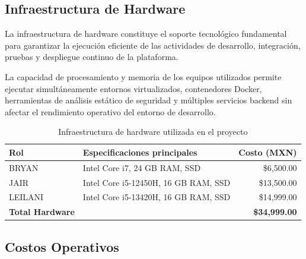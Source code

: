 \documentclass[12pt,oneside,letterpaper]{book}
\begin{document}
\vspace{0.5cm}

\subsection{Infraestructura de Hardware}

La infraestructura de hardware constituye el soporte tecnológico fundamental para garantizar la ejecución eficiente de las actividades de desarrollo, integración, pruebas y despliegue continuo de la plataforma.

La capacidad de procesamiento y memoria de los equipos utilizados permite ejecutar simultáneamente entornos virtualizados, contenedores Docker, herramientas de análisis estático de seguridad y múltiples servicios backend sin afectar el rendimiento operativo del entorno de desarrollo.

\begin{table}[H]
\centering
\caption{Infraestructura de hardware utilizada en el proyecto}

\begin{tabular}{p{3cm} p{8cm} r}
\toprule
\rowcolor{headerblue}
\textbf{Rol} & \textbf{Especificaciones principales} & \textbf{Costo (MXN)} \\
\midrule

BRYAN &
Intel Core i7, 24 GB RAM, SSD &
\$6,500.00 \\

JAIR &
Intel Core i5-12450H, 16 GB RAM, SSD &
\$13,500.00 \\

LEILANI &
Intel Core i5-13420H, 16 GB RAM, SSD &
\$14,999.00 \\

\midrule
\textbf{Total Hardware} & & \textbf{\$34,999.00} \\

\bottomrule
\end{tabular}
\end{table}

\vspace{0.5cm}

\subsection{Costos Operativos}
\end{document}
